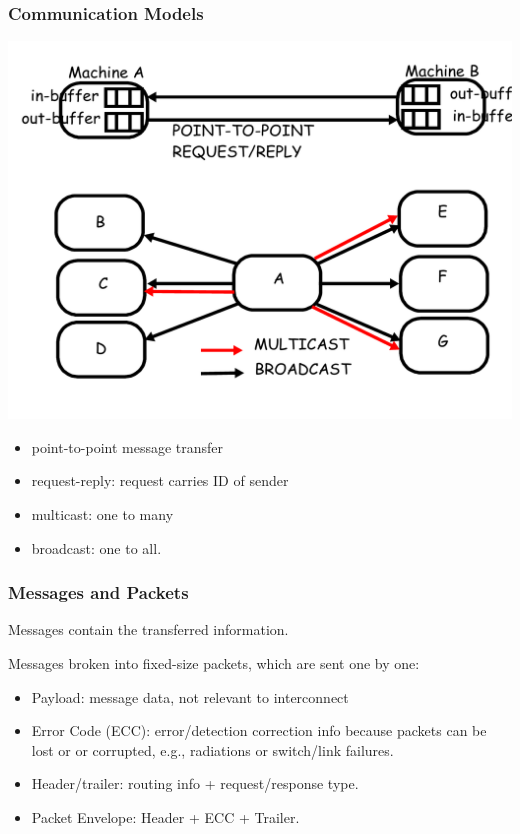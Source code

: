 \documentclass{beamer}
\newcommand{\emp}[1]{\textcolor{DikuRed}{ #1}}
\begin{document}
\begin{frame}[fragile,t]
\frametitle{Communication Models}

\includegraphics[width=47ex]{Figures/FigsInterconnect/SimpleCommun}\pause

\vspace{-2ex}
\begin{itemize}
    \item \emp{point-to-point} message transfer
    \item \emp{request-reply}: request carries ID of sender
    \item \emp{multicast}: one to many
    \item \emp{broadcast}: one to all. 
\end  {itemize}

\end{frame}


\begin{frame}[fragile,t]
\frametitle{Messages and Packets}


Messages contain the transferred information. 
\medskip

Messages broken into fixed-size packets, which are sent one by one:
 \pause

\begin{itemize}
    \item \emp{Payload}: message data, not relevant to interconnect
    \item \emp{Error Code (ECC)}: error/detection correction info because packets 
            can be lost or or corrupted, e.g., radiations or switch/link failures.
    \item \emp{Header/trailer}: routing info + request/response type.
    \item \emp{Packet Envelope}: Header + ECC + Trailer. 
\end  {itemize}

\end{frame}
\end{document}
